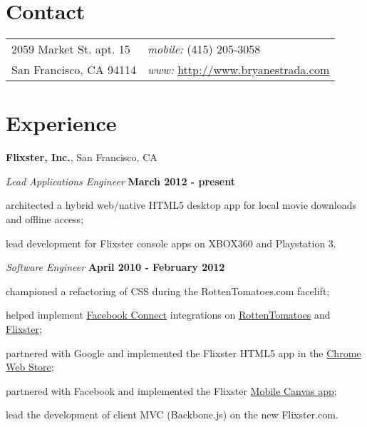 \documentclass[margin,line]{res}
\newenvironment{list1}{
  \begin{list}{\ding{113}}{%
      \setlength{\itemsep}{0in}
      \setlength{\parsep}{0in} \setlength{\parskip}{0in}
      \setlength{\topsep}{0in} \setlength{\partopsep}{0in} 
      \setlength{\leftmargin}{0.17in}}}{\end{list}}
\begin{document}

\begin{resume}
\section{\sc \large Contact}
\vspace{.05in}
\begin{tabular}{@{}p{2in}p{4in}}
2059 Market St. apt. 15    & {\it mobile:} (415) 205-3058 \\            
San Francisco, CA 94114    & {\it www:} \url{http://www.bryanestrada.com} \\         
\end{tabular}


\section{\sc \large Experience}
{\bf Flixster, Inc.}, San Francisco, CA

\vspace{-.3cm}
{\em Lead Applications Engineer} \hfill {\small \bf March 2012 - present}
\begin{list1}
\item[] architected a hybrid web/native HTML5 desktop app for local movie downloads and offline access;
\item[] lead development for Flixster console apps on XBOX360 and Playstation 3.
\end{list1}

\vspace{-.3cm}
{\em Software Engineer} \hfill {\small \bf April 2010 - February 2012}
\begin{list1}
\item[] championed a refactoring of CSS during the RottenTomatoes.com facelift;
\item[] helped implement \href{http://www.facebook.com/instantpersonalization/}{Facebook Connect} integrations on \href{http://www.rottentomatoes.com/}{RottenTomatoes} and \href{http://www.flixster.com/}{Flixster};
\item[] partnered with Google and implemented the Flixster HTML5 app in the \href{https://chrome.google.com/webstore/detail/hgbpjlnkjhllfgfdmieompodgaefjcfh}{Chrome Web Store};
\item[] partnered with Facebook and implemented the Flixster \href{http://www.facebookmobileweb.com/showcase/}{Mobile Canvas app};
\item[] lead the development of client MVC (Backbone.js) on the new Flixster.com.
\end{list1}


\end{resume}
\end{document}

